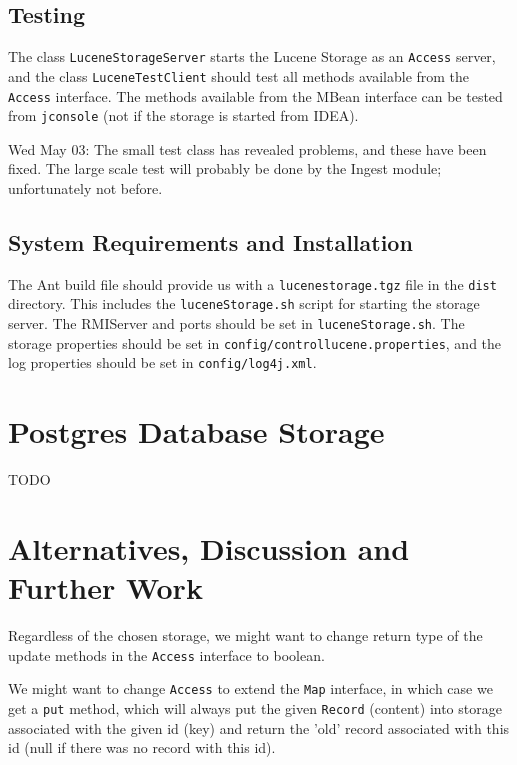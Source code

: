 \documentclass[a4paper,12pt]{article}
\begin{document}
\subsection{Testing}

The class \texttt{LuceneStorageServer} starts the Lucene Storage as an
\texttt{Access} server, and the class \texttt{LuceneTestClient} should
test all methods available from the \texttt{Access} interface. The
methods available from the MBean interface can be tested from
\texttt{jconsole} (not if the storage is started from IDEA).

Wed May 03: The small test class has revealed problems, and these have
been fixed. The large scale test will probably be done by the Ingest
module; unfortunately not before.

\subsection{System Requirements and Installation}

The Ant build file should provide us with a \texttt{lucenestorage.tgz}
file in the \texttt{dist} directory. This includes the
\texttt{luceneStorage.sh} script for starting the storage server. The
RMIServer and ports should be set in \texttt{luceneStorage.sh}. The
storage properties should be set in
\texttt{config/controllucene.properties}, and the log properties
should be set in \texttt{config/log4j.xml}.

\section{Postgres Database Storage}

TODO

\section{Alternatives, Discussion and Further Work}

Regardless of the chosen storage, we might want to change return type
of the update methods in the \texttt{Access} interface to boolean.

We might want to change \texttt{Access} to extend the \texttt{Map}
interface, in which case we get a \texttt{put} method, which will
always put the given \texttt{Record} (content) into storage associated
with the given id (key) and return the 'old' record associated with
this id (null if there was no record with this id).
\end{document}
